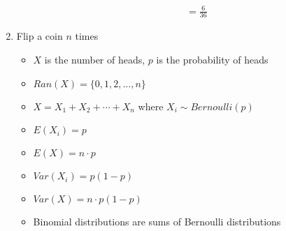 \documentclass[12pt]{article}
\begin{document}
\begin{enumerate}
\begin{itemize}
\begin{align*}
                        &= \frac{6}{36}
                    \end{align*}
                \end{itemize}
                \item Flip a coin $n$ times
                \begin{itemize}
                    \item $X$ is the number of heads, $p$ is the probability of heads
                    \item $Ran(X) = \{0, 1, 2, \ldots, n\}$
                    \item $X = X_1 + X_2 + \cdots + X_n$ where $X_i \sim Bernoulli(p)$
                    \item $E(X_i) = p$
                    \item $E(X) = n \cdot p$
                    \item $Var(X_i) = p(1-p)$
                    \item $Var(X) = n \cdot p(1-p)$
                    \item Binomial distributions are sums of Bernoulli distributions
                \end{itemize}
            \end{enumerate}
\end{document}
